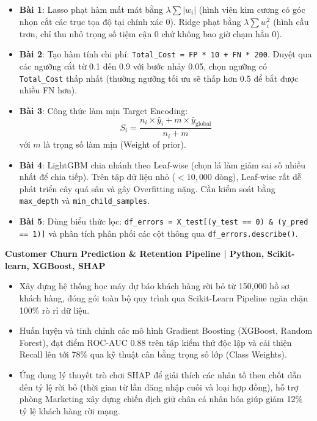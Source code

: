 \begin{dapanbox}
\begin{itemize}
    \item \textbf{Bài 1}: Lasso phạt hàm mất mát bằng $\lambda \sum |w_i|$ (hình viên kim cương có góc nhọn cắt các trục tọa độ tại chính xác 0). Ridge phạt bằng $\lambda \sum w_i^2$ (hình cầu trơn, chỉ thu nhỏ trọng số tiệm cận 0 chứ không bao giờ chạm hẳn 0).
    \item \textbf{Bài 2}: Tạo hàm tính chi phí:
    \texttt{Total\_Cost = FP * 10 + FN * 200}. Duyệt qua các ngưỡng cắt từ 0.1 đến 0.9 với bước nhảy 0.05, chọn ngưỡng có \texttt{Total\_Cost} thấp nhất (thường ngưỡng tối ưu sẽ thấp hơn 0.5 để bắt được nhiều FN hơn).
    \item \textbf{Bài 3}: Công thức làm mịn Target Encoding:
    \[
    S_i = \frac{n_i \times \bar{y}_i + m \times \bar{y}_{\text{global}}}{n_i + m}
    \]
    với $m$ là trọng số làm mịn (Weight of prior).
    \item \textbf{Bài 4}: LightGBM chia nhánh theo Leaf-wise (chọn lá làm giảm sai số nhiều nhất để chia tiếp). Trên tập dữ liệu nhỏ ($<10,000$ dòng), Leaf-wise rất dễ phát triển cây quá sâu và gây Overfitting nặng. Cần kiểm soát bằng \texttt{max\_depth} và \texttt{min\_child\_samples}.
    \item \textbf{Bài 5}: Dùng biểu thức lọc:
    \texttt{df\_errors = X\_test[(y\_test == 0) \& (y\_pred == 1)]} và phân tích phân phối các cột thông qua \texttt{df\_errors.describe()}.
\end{itemize}
\end{dapanbox}

\begin{cvtipbox}
\textbf{Customer Churn Prediction \& Retention Pipeline | Python, Scikit-learn, XGBoost, SHAP}
\begin{itemize}
    \item Xây dựng hệ thống học máy dự báo khách hàng rời bỏ từ 150,000 hồ sơ khách hàng, đóng gói toàn bộ quy trình qua Scikit-Learn Pipeline ngăn chặn 100\% rò rỉ dữ liệu.
    \item Huấn luyện và tinh chỉnh các mô hình Gradient Boosting (XGBoost, Random Forest), đạt điểm ROC-AUC 0.88 trên tập kiểm thử độc lập và cải thiện Recall lên tới 78\% qua kỹ thuật cân bằng trọng số lớp (Class Weights).
    \item Ứng dụng lý thuyết trò chơi SHAP để giải thích các nhân tố then chốt dẫn đến tỷ lệ rời bỏ (thời gian từ lần đăng nhập cuối và loại hợp đồng), hỗ trợ phòng Marketing xây dựng chiến dịch giữ chân cá nhân hóa giúp giảm 12\% tỷ lệ khách hàng rời mạng.
\end{itemize}
\end{cvtipbox}
